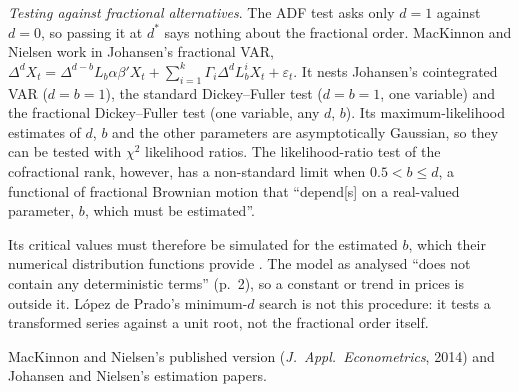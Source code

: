 \begin{qfmethod}
\emph{Testing against fractional alternatives}. The ADF test asks only $d=1$ against $d=0$, so passing it at $d^*$ says nothing about the fractional order. MacKinnon and Nielsen work in Johansen's fractional VAR, $\Delta^dX_t=\Delta^{d-b}L_b\alpha\beta'X_t+\sum_{i=1}^k\Gamma_i\Delta^dL_b^iX_t+\varepsilon_t$. It nests Johansen's cointegrated VAR ($d=b=1$), the standard Dickey--Fuller test ($d=b=1$, one variable) and the fractional Dickey--Fuller test (one variable, any $d$, $b$). Its maximum-likelihood estimates of $d$, $b$ and the other parameters are asymptotically Gaussian, so they can be tested with $\chi^2$ likelihood ratios. The likelihood-ratio test of the cofractional rank, however, has a non-standard limit when $0.5<b\le d$, a functional of fractional Brownian motion that ``depend[s] on a real-valued parameter, $b$, which must be estimated''.

Its critical values must therefore be simulated for the estimated $b$, which their numerical distribution functions provide \citep[CREATES version of September 2010, abstract and secs.~1--2, eqs.~(1)--(2), pp.~1--4]{mackinnon-nielsen-2010-wp}. The model as analysed ``does not contain any deterministic terms'' (p.~2), so a constant or trend in prices is outside it. López de Prado's minimum-$d$ search is not this procedure: it tests a transformed series against a unit root, not the fractional order itself.

 MacKinnon and Nielsen's published version (\emph{J.\ Appl.\ Econometrics}, 2014) and Johansen and Nielsen's estimation papers.

\end{qfmethod}
